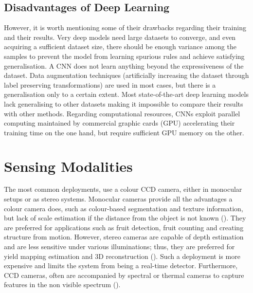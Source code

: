 \subsection{Disadvantages of Deep Learning}
However, it is worth mentioning some of their drawbacks regarding their training and their results. Very deep models need large datasets to converge, and even acquiring a sufficient dataset size, there should be enough variance among the samples to prevent the model from learning spurious rules and achieve satisfying generalisation. A CNN does not learn anything beyond the expressiveness of the dataset. Data augmentation techniques (artificially increasing the dataset through label preserving transformations) are used in most cases, but there is a generalisation only to a certain extent. Most state-of-the-art deep learning models lack generalising to other datasets making it impossible to compare their results with other methods. Regarding computational resources, CNNs exploit parallel computing maintained by commercial graphic cards (GPU) accelerating their training time on the one hand, but require sufficient GPU memory on the other.


\section{Sensing Modalities}
The most common deployments, use a colour CCD camera, either in monocular setups or as stereo systems. Monocular cameras provide all the advantages a colour camera does, such as colour-based segmentation and texture information, but lack of scale estimation if the distance from the object is not known (\cite{gongal2015sensors}). They are preferred for applications such as fruit detection, fruit counting and creating structure from motion. However, stereo cameras are capable of depth estimation and are less sensitive under various illuminations; thus, they are preferred for yield mapping estimation and 3D reconstruction (\cite{wang2016localisation}). Such a deployment is more expensive and limits the system from being a real-time detector. Furthermore, CCD cameras, often are accompanied by spectral or thermal cameras to capture features in the non visible spectrum (\cite{gongal2015sensors}).

